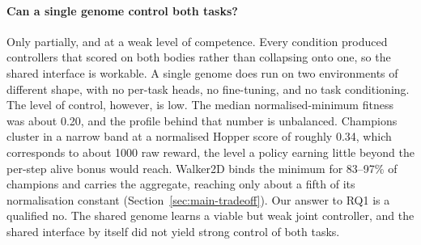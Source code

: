 \documentclass[12pt]{article}
\begin{document}
\paragraph{Can a single genome control both tasks?}
Only partially, and at a weak level of competence.
Every condition produced controllers that scored on both bodies rather than collapsing onto one, so the shared interface is workable. A single genome does run on two environments of different shape, with no per-task heads, no fine-tuning, and no task conditioning.
The level of control, however, is low.
The median normalised-minimum fitness was about 0.20, and the profile behind that number is unbalanced.
Champions cluster in a narrow band at a normalised Hopper score of roughly 0.34, which corresponds to about 1000 raw reward, the level a policy earning little beyond the per-step alive bonus would reach.
Walker2D binds the minimum for 83--97\% of champions and carries the aggregate, reaching only about a fifth of its normalisation constant (Section~\ref{sec:main-tradeoff}).
Our answer to RQ1 is a qualified no. The shared genome learns a viable but weak joint controller, and the shared interface by itself did not yield strong control of both tasks.

\end{document}
